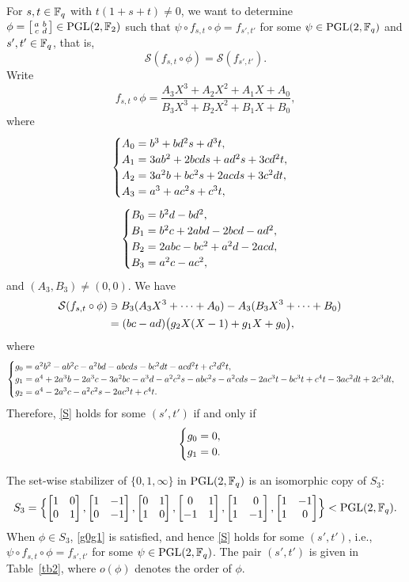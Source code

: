 \documentclass{amsart}
\numberwithin{equation}{section}
\theoremstyle{definition}
\newcommand{\f}{\Bbb F}
\newcommand{\pgl}{\mathrm{PGL}}
\begin{document}
For $s,t\in\f_q$ with $t(1+s+t)\ne 0$, we want to determine $\phi=\left[\begin{smallmatrix}a&b\cr c&d\end{smallmatrix}\right]\in\pgl(2,\f_2)$ such that $\psi\circ f_{s,t}\circ\phi=f_{s',t'}$ for some $\psi\in\pgl(2,\f_q)$ and $s',t'\in\f_q$, that is,
\begin{equation}\label{S}
\mathcal S(f_{s,t}\circ\phi)=\mathcal S(f_{s',t'}).
\end{equation}
Write
\[
f_{s,t}\circ\phi=\frac{A_3X^3+A_2X^2+A_1X+A_0}{B_3X^3+B_2X^2+B_1X+B_0},
\]
where
\[
\begin{cases}
A_0=b^3+b d^2 s+d^3 t,\cr
A_1=3 a b^2+2 b c d s+a d^2 s+3 c d^2 t,\cr
A_2=3 a^2 b + b c^2 s + 2 a c d s + 3 c^2 d t,\cr
A_3=a^3+a c^2 s+c^3 t,
\end{cases}
\]
\[
\begin{cases}
B_0=b^2 d - b d^2,\cr
B_1=b^2 c+2 a b d-2 b c d-a d^2,\cr
B_2=2 a b c-b c^2+a^2 d-2 a c d,\cr
B_3=a^2 c-a c^2,
\end{cases}
\]
and $(A_3,B_3)\ne (0,0)$.
We have
\begin{align*}
\mathcal S(f_{s,t}\circ\phi)&\ni B_3(A_3X^3+\cdots+A_0)-A_3(B_3X^3+\cdots+B_0)\cr
&=(bc-ad)\bigl(g_2X(X-1)+g_1X+g_0\bigr),
\end{align*}
where
\[
\begin{cases}
g_0=a^2 b^2-a b^2 c-a^2 b d-a b c d s-b c^2 d t-a c d^2 t+c^2 d^2 t,\cr
g_1=a^4+2 a^3 b-2 a^3 c-3 a^2 b c-a^3 d-a^2 c^2 s-a b c^2 s-a^2 c d s-2 a c^3 t-b c^3 t+c^4 t-3 a c^2 d t+2 c^3 d t,\cr
g_2=a^4 - 2 a^3 c - a^2 c^2 s - 2 a c^3 t + c^4 t.
\end{cases}
\]
Therefore, \eqref{S} holds for some $(s',t')$ if and only if
\begin{equation}\label{g0g1}
\begin{cases}
g_0=0,\cr
g_1=0.
\end{cases}
\end{equation}

The set-wise stabilizer of $\{0,1,\infty\}$ in $\pgl(2,\f_q)$ is an isomorphic copy of $S_3$:
\[
S_3=\Bigl\{
\left[\begin{matrix}1&0\cr 0&1\end{matrix}
\right],
\left[\begin{matrix}1&-1\cr 0&-1\end{matrix}
\right],
\left[\begin{matrix}0&1\cr 1&0\end{matrix}
\right],
\left[\begin{matrix}0&1\cr -1&1\end{matrix}
\right],
\left[\begin{matrix}1&0\cr 1&-1\end{matrix}
\right],
\left[\begin{matrix}1&-1\cr 1&0\end{matrix}
\right]
\Bigr\}<\pgl(2,\f_q).
\]
When $\phi\in S_3$, \eqref{g0g1} is satisfied, and hence \eqref{S} holds for some $(s',t')$, i.e., $\psi\circ f_{s,t}\circ\phi=f_{s',t'}$ for some $\psi\in\pgl(2,\f_q)$. The pair $(s',t')$ is given in Table~\ref{tb2}, where $o(\phi)$ denotes the order of $\phi$.
\end{document}
